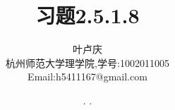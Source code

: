 \documentclass[a4paper, 12pt]{article} %
\makeatletter
\renewcommand{\maketitle}{ %
  \renewcommand\refname{参考文献}
  \newcommand{\D}{\displaystyle}\newcommand{\ri}{\Rightarrow}
  \newcommand{\ds}{\displaystyle} \renewcommand{\ni}{\noindent}
  \newcommand{\pa}{\partial} \newcommand{\Om}{\Omega}
  \newcommand{\om}{\omega} \newcommand{\sik}{\sum_{i=1}^k}
  \newcommand{\vov}{\Vert\omega\Vert} \newcommand{\Umy}{U_{\mu_i,y^i}}
  \newcommand{\lamns}{\lambda_n^{^{\scriptstyle\sigma}}}
  \newcommand{\chiomn}{\chi_{_{\Omega_n}}}
  \newcommand{\ullim}{\underline{\lim}} \newcommand{\bsy}{\boldsymbol}
  \newcommand{\mvb}{\mathversion{bold}} \newcommand{\la}{\lambda}
  \newcommand{\La}{\Lambda} \newcommand{\va}{\varepsilon}
  \newcommand{\be}{\beta} \newcommand{\al}{\alpha}
  \newcommand{\dis}{\displaystyle} \newcommand{\R}{{\mathbb R}}
  \newcommand{\N}{{\mathbb N}} \newcommand{\cF}{{\mathcal F}}
  \newcommand{\gB}{{\mathfrak B}} \newcommand{\eps}{\epsilon}
  \begin{flushright} %
    {\LARGE\@title} %
    
    \vspace{50pt} %
    
    {\large\@author} %
    \\\@date %
    
    \vspace{40pt} %
  \end{flushright}
}
\makeatother
\begin{document}
\begin{CJK}{UTF8}{gkai}
  \title{\textbf{习题2.5.1.8}} 
  \author{\small{叶卢庆}\\{\small{杭州师范大学理学院,学号:1002011005}}\\{\small{Email:h5411167@gmail.com}}} %
  \renewcommand{\today}{\number\year. \number\month. \number\day}
  \date{\today} %
  
  
  
  \maketitle %
  
  
  
  
  
  
  

\end{CJK}
\end{document}
